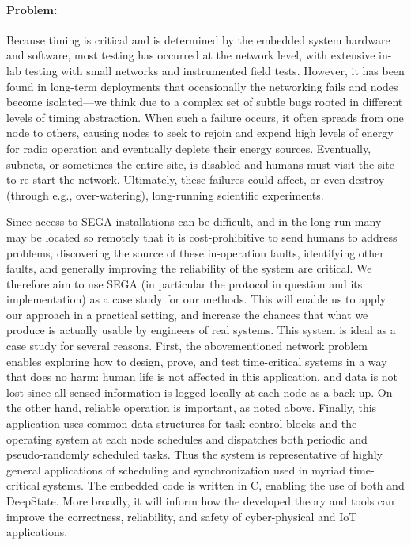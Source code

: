 \paragraph{Problem:}

Because timing is critical and is determined by the embedded system hardware and software, most testing has occurred at the network level, with extensive in-lab testing with small networks and instrumented field tests.
However, it has been found in long-term deployments %
that occasionally the networking fails and nodes become isolated---we think due to a complex set of subtle bugs rooted in different levels of timing abstraction.
When such a failure occurs, it often spreads from one node to others,
causing nodes to seek to rejoin and expend high levels of energy for radio operation and eventually deplete their energy sources.
Eventually, subnets, or sometimes the entire site, is disabled and humans must visit the site to re-start the network.
Ultimately, these failures could %
affect, %
or even destroy (through e.g., over-watering), long-running scientific experiments.


Since access to SEGA installations can be difficult, and in the long run many may be located so remotely that it is cost-prohibitive to send humans to address problems, discovering the source of these in-operation faults, identifying other faults, and generally improving the reliability of the system are critical.
We therefore aim to use SEGA (in particular the protocol in question and its implementation) as a case study for our methods.
This will enable us to apply our approach in a practical setting, and increase the chances that what we produce is actually usable by engineers of real systems.
%
This system is ideal as a case study for several reasons.
First, the abovementioned network problem enables exploring how to design, prove, and test time-critical systems in a way that does no harm: human life is not affected in this application, and data is not lost since all sensed information is logged locally at each node as a back-up.
On the other hand, reliable operation is important, as noted above. %
Finally, this application uses common data structures for task control blocks and the operating system at each node schedules and dispatches both periodic and pseudo-randomly scheduled tasks.
Thus the system is representative of %
highly general applications of scheduling and synchronization used in myriad time-critical systems.
The embedded code is written in C, enabling the use of both \framac and DeepState.
More broadly, it will inform how the developed theory and tools can improve the correctness, reliability, and safety of cyber-physical and IoT applications.


